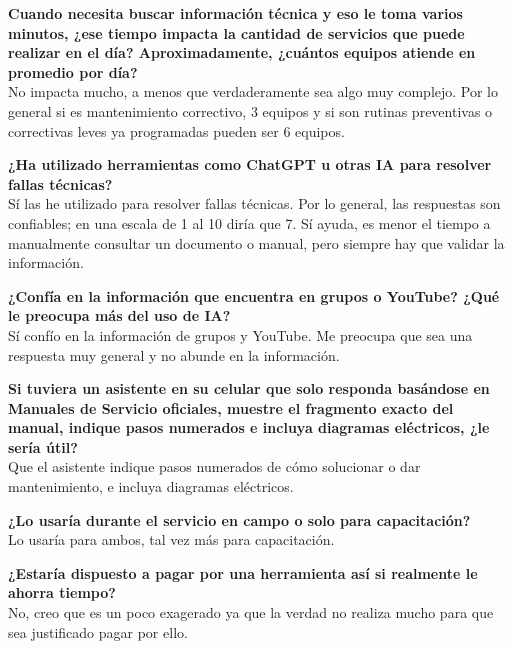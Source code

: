 {{    \textbf{Cuando necesita buscar información técnica y eso le toma varios minutos, ¿ese tiempo impacta la cantidad de servicios que puede realizar en el día? Aproximadamente, ¿cuántos equipos atiende en promedio por día?}\\
    No impacta mucho, a menos que verdaderamente sea algo muy complejo. Por lo general si es mantenimiento correctivo, 3 equipos y si son rutinas preventivas o correctivas leves ya programadas pueden ser 6 equipos.

    \textbf{¿Ha utilizado herramientas como ChatGPT u otras IA para resolver fallas técnicas?}\\
    Sí las he utilizado para resolver fallas técnicas. Por lo general, las respuestas son confiables; en una escala de 1 al 10 diría que 7. Sí ayuda, es menor el tiempo a manualmente consultar un documento o manual, pero siempre hay que validar la información.

    \textbf{¿Confía en la información que encuentra en grupos o YouTube? ¿Qué le preocupa más del uso de IA?}\\
    Sí confío en la información de grupos y YouTube. Me preocupa que sea una respuesta muy general y no abunde en la información.

    \textbf{Si tuviera un asistente en su celular que solo responda basándose en Manuales de Servicio oficiales, muestre el fragmento exacto del manual, indique pasos numerados e incluya diagramas eléctricos, ¿le sería útil?}\\
    Que el asistente indique pasos numerados de cómo solucionar o dar mantenimiento, e incluya diagramas eléctricos.

    \textbf{¿Lo usaría durante el servicio en campo o solo para capacitación?}\\
    Lo usaría para ambos, tal vez más para capacitación.

    \textbf{¿Estaría dispuesto a pagar por una herramienta así si realmente le ahorra tiempo?}\\
    No, creo que es un poco exagerado ya que la verdad no realiza mucho para que sea justificado pagar por ello.

    }

    }
